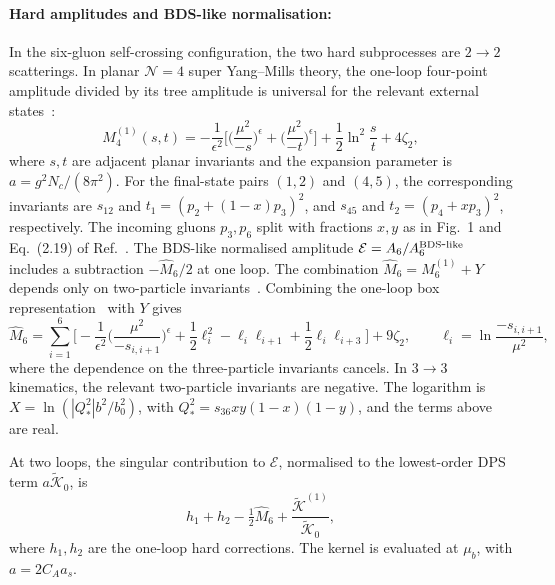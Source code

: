 \documentclass[%
 onecolumn,
 superscriptaddress,
 preprintnumbers,
 nofootinbib,
 amsmath,amssymb,
 aps,
 prl,
]{revtex4-2}
\begin{document}
\paragraph{Hard amplitudes and BDS-like normalisation: }
In the six-gluon self-crossing configuration,
the two hard subprocesses are $2\to2$
scatterings. In planar $\mathcal N=4$
super Yang--Mills theory, the one-loop
four-point amplitude divided by its
tree amplitude is universal for the
relevant external states~\cite{Bern:1994zx,Bern:2005iz}:
\begin{equation}
M_4^{(1)}(s,t)=-\frac1{\epsilon^2}\Big[\Big(\frac{\mu^2}{-s}\Big)^\epsilon+\Big(\frac{\mu^2}{-t}\Big)^\epsilon\Big]
+\frac12\ln^2\frac st+4\zeta_2,
\label{eq:m4}
\end{equation}
where $s,t$ are adjacent planar invariants
and the expansion parameter is
$a=g^2N_c/(8\pi^2)$.
%
For the final-state pairs $(1,2)$ and
$(4,5)$, the corresponding invariants
are $s_{12}$ and
$t_1=(p_2+(1-x)p_3)^2$, and
$s_{45}$ and $t_2=(p_4+xp_3)^2$,
respectively. The incoming gluons
$p_3,p_6$ split with fractions $x,y$
as in Fig.~1 and Eq.~(2.19) of
Ref.~\cite{Dixon:2016epj}.
%
The BDS-like normalised amplitude
$\mathcal E=A_6/A_6^{\rm BDS\mbox{-}like}$
includes a subtraction
$-\hat M_6/2$ at one loop.
The combination
$\hat M_6=M_6^{(1)}+Y$
depends only on two-particle invariants~\cite{Dixon:2016epj}.
Combining the one-loop box representation~\cite{Bern:1994zx} with $Y$ gives
\begin{equation}
\hat M_6=\sum_{i=1}^6\Big[-\frac1{\epsilon^2}\Big(\frac{\mu^2}{-s_{i,i+1}}\Big)^\epsilon
+\frac12\ell_i^2-\ell_i\ell_{i+1}+\frac12\ell_i\ell_{i+3}\Big]+9\zeta_2,\qquad
\ell_i=\ln\frac{-s_{i,i+1}}{\mu^2},
\label{eq:m6hat}
\end{equation}
where the dependence on the
three-particle invariants cancels.
%
In $3\to3$ kinematics, the relevant
two-particle invariants are negative.
The logarithm is
$X=\ln(|Q_*^2|b^2/b_0^2)$, with
$Q_*^2=s_{36}xy(1-x)(1-y)$,
and the terms above are real.

At two loops, the singular contribution
to $\mathcal E$, normalised to the
lowest-order DPS term
$a\widetilde{\mathcal K}_0$, is
\begin{equation}
h_1+h_2-\tfrac12\hat M_6+\frac{\widetilde{\mathcal K}^{(1)}}{\widetilde{\mathcal K}_0},
\label{eq:e2}
\end{equation}
where $h_1,h_2$ are the one-loop
hard corrections. The kernel is
evaluated at $\mu_b$, with
$a=2C_Aa_s$.
\end{document}
